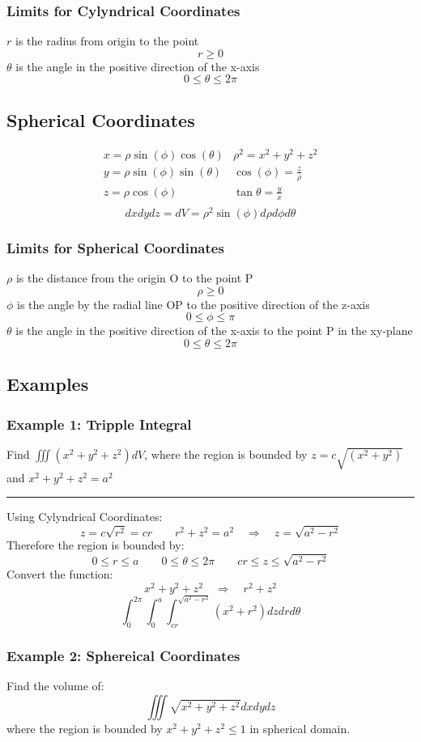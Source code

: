 \subsubsection{Limits for Cylyndrical Coordinates}
$r$ is the radius from origin to the point
$$r\geq 0$$
$\theta$ is the angle in the positive direction of the x-axis
$$0\leq\theta \leq 2\pi$$

\subsection{Spherical Coordinates}
$$\begin{array}{ll}
  x=\rho \sin(\phi) \cos(\theta)&\rho^2=x^2+y^2+z^2\\       
  y=\rho \sin(\phi) \sin(\theta)&\cos(\phi)=\frac{z}{\rho}\\
  z=\rho \cos(\phi)&             \tan \theta=\frac{y}{x}\\  
\end{array}$$
$$dx dydz=dV=\rho^{2}\sin(\phi)d\rho d\phi d\theta$$
\subsubsection{Limits for Spherical Coordinates}
$\rho$ is the distance from the origin O to the point P
$$\rho \geq 0$$
$\phi$ is the angle by the radial line OP to the positive direction of the z-axis
$$0\leq \phi \leq \pi$$
$\theta$ is the angle in the positive direction of the x-axis to the point P in the xy-plane
$$0\leq\theta \leq 2\pi$$

\subsection{Examples}
\subsubsection{Example 1: Tripple Integral}
Find $\iiint(x^{2}+y^{2}+z^{2})d V$, where the region is bounded by
$z=c\sqrt{(x^{2}+y^{2})}$ and $x^{2}+y^{2}+z^{2}=a^{2}$

\rule{\textwidth}{0.5pt}

Using Cylyndrical Coordinates:
$$z=c\sqrt{r^2}=cr\qquad r^2+z^2=a^2\quad\Rightarrow\quad z=\sqrt{a^2-r^2}$$
Therefore the region is bounded by:
$$0\leq r\leq a\qquad 0\leq\theta\leq 2\pi\qquad cr\leq z\leq\sqrt{a^2-r^2}$$
Convert the function:
$$x^2+y^2+z^2\quad\Rightarrow\quad r^2+z^2$$
$$\int_0^{2\pi}\int_0^a\int_{cr}^{\sqrt{a^2-r^2}}(x^2+r^2)dzdrd\theta$$
\subsubsection{Example 2: Sphereical Coordinates}
Find the volume of:
$$\iiint\sqrt{x^2+y^2+z^2}dxdydz$$
where the region is bounded by $x^2+y^2+z^2\leq1$ in spherical domain.

